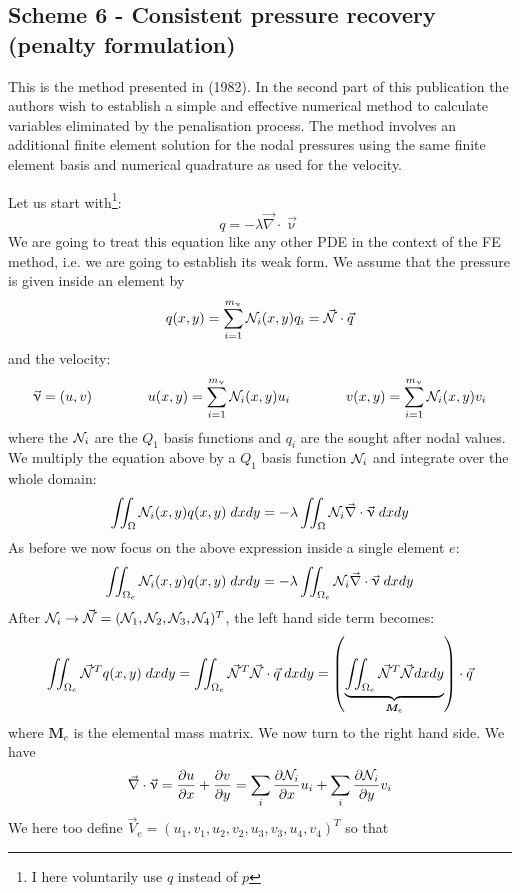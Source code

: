 \subsection{Scheme 6 - Consistent pressure recovery (penalty formulation) \label{ss:cpr}}

This is the method presented in \textcite{zina82} (1982). In the second part 
of this publication the authors wish to establish a simple and effective 
numerical method to calculate variables eliminated by the penalisation process. 
The method involves an additional finite element solution for the nodal 
pressures using the same finite element basis and numerical quadrature 
as used for the velocity.

Let us start with\footnote{I here voluntarily use $q$ instead of $p$}:
\[
q = -\lambda \vec\nabla\cdot \vec\upnu
\]
We are going to treat this equation like any other PDE in the context 
of the FE method, i.e. we are going to establish its weak form. 
We assume that the pressure is given inside an element by
\[
q(x,y) = \sum_{i=1}^{m_\upnu} {\mathcal{N}}_i(x,y) q_i = \vec{{\mathcal{N}}} \cdot \vec{q}
\]
and the velocity:
\[
\vec\upnu = (u,v) 
\qquad 
\qquad 
u(x,y)  = \sum_{i=1}^{m_\upnu} {\mathcal{N}}_i(x,y) u_i
\qquad 
\qquad 
v(x,y)  = \sum_{i=1}^{m_\upnu} {\mathcal{N}}_i(x,y) v_i
\]
where the ${\mathcal{N}}_i$ are the $Q_1$ basis functions and $q_i$ are the sought after nodal values. 
We multiply the equation above by a $Q_1$ basis function ${\mathcal{N}}_i$ and integrate over the whole domain:
\[
\iint_\Omega {\mathcal{N}}_i(x,y) q(x,y) \; dxdy 
= -\lambda \iint_\Omega {\mathcal{N}}_i \vec\nabla\cdot \vec\upnu  \; dx dy
\]
As before we now focus on the above expression inside a single element $e$:
\[
\iint_{\Omega_e} {\mathcal{N}}_i(x,y) q(x,y) \; dxdy = -\lambda \iint_{\Omega_e} {\mathcal{N}}_i \vec\nabla\cdot \vec\upnu \; dx dy
\]
After ${\mathcal{N}}_i \rightarrow \vec{{\mathcal{N}}}=({\mathcal{N}}_1,{\mathcal{N}}_2,{\mathcal{N}}_3,{\mathcal{N}}_4)^T$, the left hand side term becomes:
\[
\iint _{\Omega_e} \vec{{\mathcal{N}}}^T q(x,y) \; dxdy 
=
\iint _{\Omega_e} \vec{{\mathcal{N}}}^T \vec{{\mathcal{N}}} \cdot \vec{q} \; dxdy 
=
\left(\underbrace{\iint _{\Omega_e} \vec{{\mathcal{N}}}^T \vec{{\mathcal{N}}} dxdy}_{{\bm M}_e} \right) \cdot \vec{q}  
\]
where ${\bm M}_e$ is the elemental mass matrix.
We now turn to the right hand side. We have
\[
\vec\nabla\cdot \vec\upnu
= \frac{\partial u}{\partial x}+\frac{\partial v}{\partial y}
= \sum_i \frac{\partial {\mathcal{N}}_i}{\partial x} u_i + \sum_i \frac{\partial {\mathcal{N}}_i}{\partial y} v_i 
\]
We here too define $\vec{V}_e=(u_1,v_1,u_2,v_2,u_3,v_3,u_4,v_4)^T$ so that 


